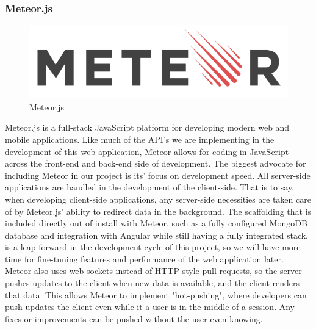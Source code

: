 \documentclass[12pt,a4paper]{report}
\begin{document}
			\subsubsection{Meteor.js}
			\begin{figure}
			\includegraphics[scale=.2]{meteorJS}
			\caption{Meteor.js}
			\label{fig: Meteor.js}
			\end{figure}
			Meteor.js is a full-stack JavaScript platform for developing modern web and mobile applications. Like much of the API's we are implementing in the development of this web application, Meteor allows for coding in JavaScript across the front-end and back-end side of development. The biggest advocate for including Meteor in our project is its' focus on development speed. All server-side applications are handled in the development of the client-side. That is to say, when developing client-side applications, any server-side necessities are taken care of by Meteor.js’ ability to redirect data in the background. The scaffolding that is included directly out of install with Meteor, such as a fully configured MongoDB database and integration with Angular while still having a fully integrated stack, is a leap forward in the development cycle of this project, so we will have more time for fine-tuning features and performance of the web application later. Meteor also uses web sockets instead of HTTP-style pull requests, so the server pushes updates to the client when new data is available, and the client renders that data. This allows Meteor to implement "hot-pushing", where developers can push updates the client even while it a user is in the middle of a session. Any fixes or improvements can be pushed without the user even knowing.
\end{document}
